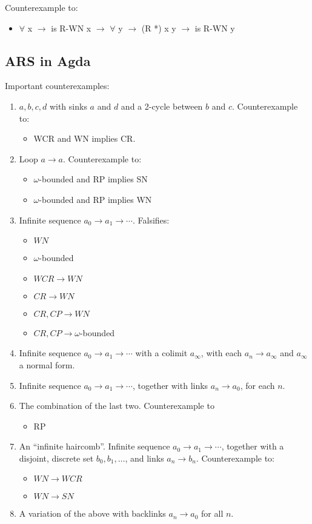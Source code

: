 \documentclass{article}
\begin{document}
Counterexample to:
\begin{itemize}
    \item  $\forall$ x $\to$ is R-WN x $\to$ $\forall$ y $\to$ (R *) x y $\to$ is R-WN y

\end{itemize}

\subsection{ARS in Agda}
Important counterexamples:
\begin{enumerate}
  \item $a,b,c,d$ with sinks $a$ and $d$ and a 2-cycle between $b$ and $c$.
  Counterexample to:
  \begin{itemize}
      \item WCR and WN implies CR.
  \end{itemize}
  \item Loop $a \to a$.
  Counterexample to:
  \begin{itemize}
    \item $\omega$-bounded and RP implies SN
    \item $\omega$-bounded and RP implies WN
  \end{itemize}
  \item Infinite sequence $a_0 \to a_1 \to \cdots$. Falsifies:
  \begin{itemize}
    \item $WN$
    \item $\omega$-bounded
    \item $WCR \to WN$
    \item $CR \to WN$
    \item $CR, CP \to WN$
    \item $CR, CP \to \omega$-bounded
  \end{itemize}
  \item Infinite sequence $a_0 \to a_1 \to \cdots$ with a colimit $a_\infty$,
  with each $a_n \to a_\infty$ and $a_\infty$ a normal form.
  \item Infinite sequence $a_0 \to a_1 \to \cdots$, together with links
  $a_n \to a_0$, for each $n$.
  \item The combination of the last two.
  Counterexample to
  \begin{itemize}
    \item RP
  \end{itemize}
  \item An ``infinite haircomb''. Infinite sequence $a_0 \to a_1 \to \cdots$, together with
  a disjoint, discrete set $b_0, b_1, \dots$, and links $a_n \to b_n$.
  Counterexample to:
  \begin{itemize}
    \item $WN\to WCR$
    \item $WN \to SN$
  \end{itemize}
  \item A variation of the above with backlinks $a_n \to a_0$ for all $n$.
\end{enumerate}
\end{document}
